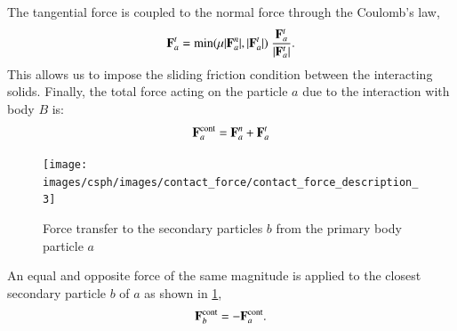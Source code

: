 The tangential force is coupled to the normal force through the Coulomb's law,
\begin{equation}
  \label{eq:Coulomb-law}
  \mathbf{F}_{a}^{t} = \min(\mu |\mathbf{F}_{a}^{n}|, |\mathbf{F}_{a}^{t}|) \
  \frac{\mathbf{F}_{a}^{t}}{|\mathbf{F}_{a}^{t}|}.
\end{equation}
This allows us to impose the sliding friction condition between the
interacting solids. Finally, the total force acting on the particle $a$ due to
the interaction with body $B$ is:
\begin{equation}
  \label{eq:contact-force}
  \mathbf{F}_{a}^{\text{cont}} = \mathbf{F}_{a}^{n} + \mathbf{F}_{a}^{t}
\end{equation}

\begin{figure}[!htpb]
  \centering
  \texttt{[image: images/csph/images/contact\_force/contact\_force\_description\_3]}
  \caption{Force transfer to the secondary particles $b$ from the primary body particle $a$}
\label{fig:secondary_particle_contact_foce_transfer}
\end{figure}
An equal and opposite force of the same magnitude is applied to the closest
secondary particle $b$ of $a$ as shown in
\cref{fig:secondary_particle_contact_foce_transfer},
\begin{equation}
  \label{eq:contact-force}
  \mathbf{F}_{b}^{\text{cont}} = - \mathbf{F}_{a}^{\text{cont}}.
\end{equation}


\FloatBarrier%
